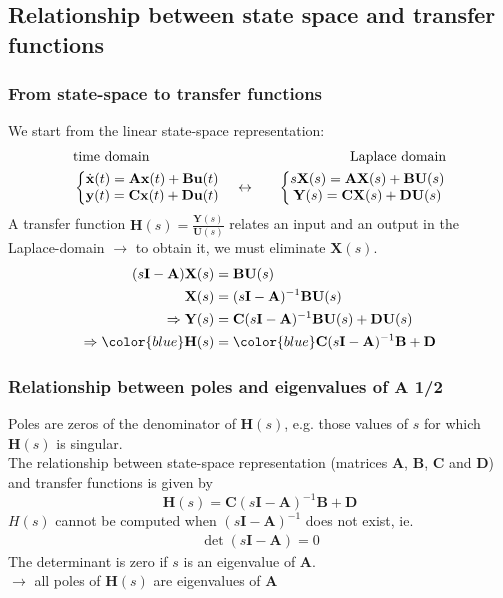 \subsection{Relationship between state space and transfer functions}

\begin{frame}
\frametitle{From state-space to transfer functions}
We start from the linear state-space representation:
\begin{align*}
&\text{time domain}\hfill &\text{Laplace domain} \\
&\left\{ \begin{matrix}
\dot{\mathbf{x}}(t) = \mathbf{A} \mathbf{x}(t) + \mathbf{B} \mathbf{u}(t) \\
\mathbf{y}(t) = \mathbf{C} \mathbf{x}(t) + \mathbf{D} \mathbf{u}(t)
\end{matrix} \right. \quad\leftrightarrow\quad
&\left\{ \begin{matrix}
s \mathbf{X}(s) = \mathbf{A} \mathbf{X}(s) + \mathbf{B} \mathbf{U}(s) \\
\mathbf{Y}(s) = \mathbf{C} \mathbf{X}(s) + \mathbf{D} \mathbf{U}(s)
\end{matrix} \right.
\end{align*}
A transfer function $\mathbf{H}(s) = \frac{\mathbf{Y}(s)}{\mathbf{U}(s)}$ relates an input and an output in the Laplace-domain $\rightarrow$ to obtain it, we must eliminate $\mathbf{X}(s)$.
\begin{align*}
(s\mathbf{I}-\mathbf{A}) \mathbf{X}(s) &= \mathbf{B} \mathbf{U}(s) \\
\mathbf{X}(s) &= (s\mathbf{I}-\mathbf{A})^{-1} \mathbf{B} \mathbf{U}(s) \\
\Rightarrow \mathbf{Y}(s) &= \mathbf{C} (s\mathbf{I}-\mathbf{A})^{-1} \mathbf{B} \mathbf{U}(s) + \mathbf{D} \mathbf{U}(s) \\
\Rightarrow \hfill {\color{blue}\mathbf{H}(s)} &= {\color{blue}\mathbf{C} (s\mathbf{I}-\mathbf{A})^{-1} \mathbf{B} + \mathbf{D}}
\end{align*}
\end{frame}

\begin{frame}
\frametitle{Relationship between poles and eigenvalues of $\mathbf{A}$ 1/2}
Poles are zeros of the denominator of $\mathbf{H}(s)$, e.g. those values of $s$ for which $\mathbf{H}(s)$ is singular.\\
The relationship between state-space representation (matrices $\mathbf{A}$, $\mathbf{B}$, $\mathbf{C}$ and $\mathbf{D}$) and transfer functions is given by
\begin{equation*}
\mathbf{H}(s) = \mathbf{C} (s\mathbf{I}-\mathbf{A})^{-1} \mathbf{B} + \mathbf{D}
\end{equation*}
$H(s)$ cannot be computed when $(s\mathbf{I}-\mathbf{A})^{-1}$ does not exist, ie.
\begin{align*}
\det(s\mathbf{I}-\mathbf{A}) = 0
\end{align*}
The determinant is zero if $s$ is an eigenvalue of $\mathbf{A}$.\\ \pause
$\rightarrow$ {\color{blue}all poles of $\mathbf{H}(s)$ are eigenvalues of $\mathbf{A}$}
\end{frame}

